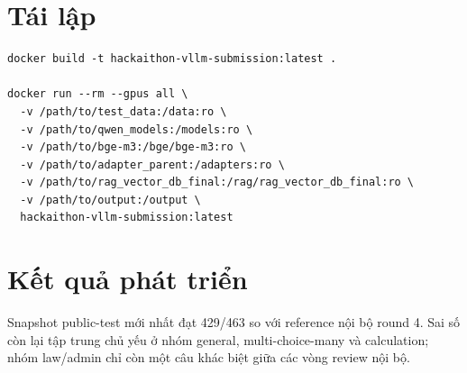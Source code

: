 \documentclass[12pt,a4paper]{article}
\begin{document}
\section{Tái lập}

\begin{verbatim}
docker build -t hackaithon-vllm-submission:latest .

docker run --rm --gpus all \
  -v /path/to/test_data:/data:ro \
  -v /path/to/qwen_models:/models:ro \
  -v /path/to/bge-m3:/bge/bge-m3:ro \
  -v /path/to/adapter_parent:/adapters:ro \
  -v /path/to/rag_vector_db_final:/rag/rag_vector_db_final:ro \
  -v /path/to/output:/output \
  hackaithon-vllm-submission:latest
\end{verbatim}

\section{Kết quả phát triển}

Snapshot public-test mới nhất đạt 429/463 so với reference nội bộ round 4.
Sai số còn lại tập trung chủ yếu ở nhóm general, multi-choice-many và
calculation; nhóm law/admin chỉ còn một câu khác biệt giữa các vòng review nội
bộ.
\end{document}
